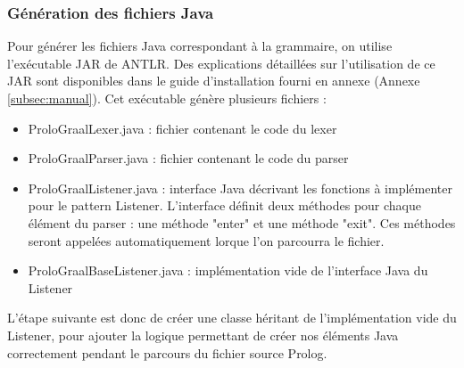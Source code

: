 \documentclass[../report.tex]{subfiles}
\begin{document}
\subsubsection{Génération des fichiers Java}
Pour générer les fichiers Java correspondant à la grammaire, on utilise l'exécutable JAR de ANTLR. Des explications détaillées sur l'utilisation de ce JAR sont disponibles dans le guide d'installation fourni en annexe (Annexe \ref{subsec:manual}). Cet exécutable génère plusieurs fichiers :
\begin{itemize}
    \item ProloGraalLexer.java : fichier contenant le code du lexer
    \item ProloGraalParser.java : fichier contenant le code du parser
    \item ProloGraalListener.java : interface Java décrivant les fonctions à implémenter pour le pattern Listener. L'interface définit deux méthodes pour chaque élément du parser : une méthode "enter" et une méthode "exit". Ces méthodes seront appelées automatiquement lorque l'on parcourra le fichier. 
    \item ProloGraalBaseListener.java : implémentation vide de l'interface Java du Listener
\end{itemize}
L'étape suivante est donc de créer une classe héritant de l'implémentation vide du Listener, pour ajouter la logique permettant de créer nos éléments Java correctement pendant le parcours du fichier source Prolog.
\end{document}
